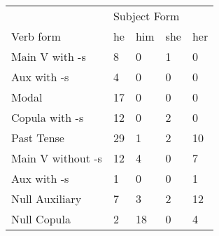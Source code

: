 \begin{table}[]
\begin{minipage}{0.5\textwidth}
\end{minipage}
\begin{minipage}{0.5\textwidth}
    \centering
    \begin{tabular}{@{}lllll@{}}
        \toprule
            &\multicolumn{4}{l}{Subject Form}\\
            \cline{2-5}
        Verb form & he & him & she & her \\
        \midrule
        Main V with -s & 8 & 0 & 1 & 0 \\
        Aux with -s & 4 & 0 & 0 & 0 \\
        Modal & 17 & 0 & 0 & 0 \\
        Copula with -s & 12 & 0 & 2 & 0 \\
        Past Tense & 29 & 1 & 2 & 10 \\
        \hline
        Main V without -s & 12 & 4 & 0 & 7 \\
        Aux with -s & 1 & 0 & 0 & 1 \\
        Null Auxiliary & 7 & 3 & 2 & 12 \\
        Null Copula & 2 & 18 & 0 & 4 \\
        \bottomrule
    \end{tabular}
    \end{minipage}
\end{table}


